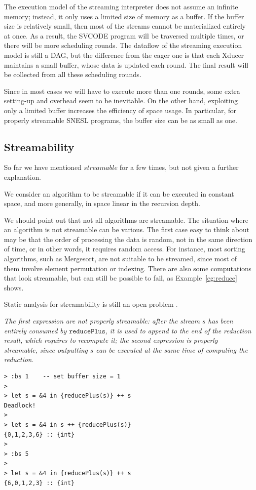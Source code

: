 The execution model of the streaming interpreter does not assume an infinite memory; instead, it only uses a limited size of memory as a buffer. 
If the buffer size is relatively small, then most of the streams cannot be materialized entirely at once. 
As a result, the SVCODE program will be traversed multiple times, or there will be more scheduling rounds. 
The dataflow of the streaming execution model is still a DAG, but the difference from the eager one is that each Xducer maintains a small buffer, whose data is updated each round. 
The final result will be collected from all these scheduling rounds.


Since in most cases we will have to execute more than one rounds, some extra setting-up and overhead seem to be inevitable.
On the other hand, exploiting only a limited buffer increases the efficiency of space usage. 
In particular, for properly streamable SNESL programs, the buffer size can be as small as one.


\subsection{Streamability}

So far we have mentioned $streamable$ for a few times, but not given a further explanation.

We consider an algorithm to be streamable if it can be executed in constant space, and more generally, in space linear in the recursion depth.

We should point out that not all algorithms are streamable. 
The situation where an algorithm is not streamable can be various.
The first case easy to think about may be that the order of processing the data is random, not in the same direction of time, or in other words, it requires random access.
For instance, most sorting algorithms, such as Mergesort, are not suitable to be streamed, since most of them involve element permutation or indexing. There are also some computations that look streamable, but can still be possible to fail, as Example~\ref{eg:reduce} shows.

Static analysis for streamability is still an open problem \cite{Fphd}.

\begin{example}\label{eg:reduce}
	\emph{The first expression are not properly streamable: after the stream $s$ has been entirely consumed by $\mathtt{reducePlus}$, it is used to append to the end of the reduction result, which requires to recompute it; the second expression is properly streamable, since outputting $s$ can be executed at the same time of computing the reduction.}
\end{example}
\begin{lstlisting}[style=nesl-style]
> :bs 1    -- set buffer size = 1
>
> let s = &4 in {reducePlus(s)} ++ s
Deadlock!
>
> let s = &4 in s ++ {reducePlus(s)}
{0,1,2,3,6} :: {int}
>
> :bs 5
>
> let s = &4 in {reducePlus(s)} ++ s
{6,0,1,2,3} :: {int}
\end{lstlisting}



